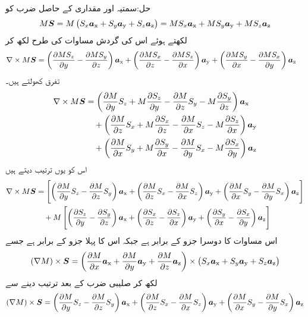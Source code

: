 حل:سمتیہ اور مقداری کے حاصل ضرب کو
\begin{align*}
M {{\boldsymbol{S}}}=M\left(S_x{\boldsymbol{a}}_{\textup{x}}+S_y{\boldsymbol{a}}_{\textup{y}}+S_z{\boldsymbol{a}}_{\textup{z}} \right)=M S_x{\boldsymbol{a}}_{\textup{x}}+M S_y{\boldsymbol{a}}_{\textup{y}}+M S_z{\boldsymbol{a}}_{\textup{z}}
\end{align*}
لکھتے ہوئے اس کی گردش مساوات  کی طرح لکھ کر
\begin{align*}
\nabla \times M{{\boldsymbol{S}}}&=\left(\frac{\partial MS_z}{\partial y}-\frac{\partial MS_y}{\partial z} \right){\boldsymbol{a}}_{\textup{x}}+\left( \frac{\partial MS_x}{\partial z}-\frac{\partial MS_z}{\partial x}\right){\boldsymbol{a}}_{\textup{y}}+\left(\frac{\partial MS_y}{\partial x}-\frac{\partial MS_x}{\partial y} \right){\boldsymbol{a}}_{\textup{z}}
\end{align*}
تفرق کھولتے ہیں۔
\begin{align*}
\nabla \times M{{\boldsymbol{S}}}&=\left(\frac{\partial M}{\partial y}S_z+M\frac{\partial S_z}{\partial y}-\frac{\partial M}{\partial z}S_y-M\frac{\partial S_y}{\partial z} \right){\boldsymbol{a}}_{\textup{x}}\\
&\quad +\left( \frac{\partial M}{\partial z}S_x+M\frac{\partial S_x}{\partial z}-\frac{\partial M}{\partial x}S_z-M\frac{\partial S_z}{\partial x}\right){\boldsymbol{a}}_{\textup{y}} \\
&\quad +\left(\frac{\partial M}{\partial x}S_y+M\frac{\partial S_y}{\partial x}-\frac{\partial M}{\partial y}S_x-M\frac{\partial S_x}{\partial y} \right){\boldsymbol{a}}_{\textup{z}}
\end{align*}
اس کو یوں ترتیب دیتے ہیں
\begin{align*}
\nabla \times M{{\boldsymbol{S}}}&=\left[\left(\frac{\partial M}{\partial y}S_z-\frac{\partial M}{\partial z}S_y\right){\boldsymbol{a}}_{\textup{x}}+\left( \frac{\partial M}{\partial z}S_x-\frac{\partial M}{\partial x}S_z\right){\boldsymbol{a}}_{\textup{y}}+\left(\frac{\partial M}{\partial x}S_y-\frac{\partial M}{\partial y}S_x\right){\boldsymbol{a}}_{\textup{z}}\right]\\
&\quad +M\left[\left(\frac{\partial S_z}{\partial y}-\frac{\partial S_y}{\partial z} \right){\boldsymbol{a}}_{\textup{x}}+\left(\frac{\partial S_x}{\partial z}-\frac{\partial S_z}{\partial x}\right){\boldsymbol{a}}_{\textup{y}} +\left(\frac{\partial S_y}{\partial x}-\frac{\partial S_x}{\partial y} \right){\boldsymbol{a}}_{\textup{z}}\right]
\end{align*}
اس مساوات کا دوسرا جزو  کے برابر ہے جبکہ اس کا پہلا جزو  کے برابر ہے جسے 
\begin{align*}
\left(\nabla M\right) \times {\ensuremath{{\boldsymbol{S}}}}=\left(\frac{\partial M}{\partial x}{\boldsymbol{a}}_{\textup{x}}+\frac{\partial M}{\partial y}{\boldsymbol{a}}_{\textup{y}}+\frac{\partial M}{\partial z}{\boldsymbol{a}}_{\textup{z}} \right) \times \left(S_x {\boldsymbol{a}}_{\textup{x}}+S_y {\boldsymbol{a}}_{\textup{y}} +S_z {\boldsymbol{a}}_{\textup{z}} \right)
\end{align*}
لکھ کر صلیبی ضرب کے بعد ترتیب دینے سے
\begin{align*}
\left(\nabla M\right) \times {\ensuremath{{\boldsymbol{S}}}}=\left(\frac{\partial M}{\partial y}S_z-\frac{\partial M}{\partial z}S_y\right){\boldsymbol{a}}_{\textup{x}}+\left( \frac{\partial M}{\partial z}S_x-\frac{\partial M}{\partial x}S_z\right){\boldsymbol{a}}_{\textup{y}}+\left(\frac{\partial M}{\partial x}S_y-\frac{\partial M}{\partial y}S_x\right){\boldsymbol{a}}_{\textup{z}}
\end{align*}
